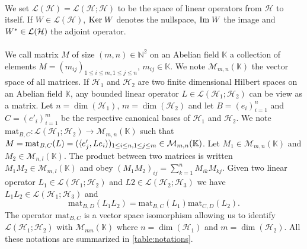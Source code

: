 \paragraph{}
We set $\mathcal{L}(\mathcal{H})=\mathcal{L}(\mathcal{H};\mathcal{H})$ to be the space of linear operators from $\mathcal{H}$ to itself. If $W\in\mathcal{L}(\mathcal{H})$, $\text{Ker}\; W$ denotes the nullspace, $\text{Im}\; W$ the image and $W^* \in \mathcal{L}(\mathcal{H})$ the adjoint operator.
\paragraph{}
We call matrix $M$ of size $(m,n)\in\mathbb{N}^2$ on an Abelian field $\mathbb{K}$ a collection of elements $M=(m_{ij})_{1\le i\le m, 1\le j \le n}$, $m_{ij}\in\mathbb{K}$. We note $\mathcal{M}_{m,n}(\mathbb{K})$ the vector space of all matrices. If $\mathcal{H}_1$ and $\mathcal{H}_2$ are two finite dimensional Hilbert spaces on an Abelian field $\mathbb{K}$, any bounded linear operator $L\in\mathcal{L}(\mathcal{H}_1;\mathcal{H}_2)$ can be view as a matrix. Let $n=\dim(\mathcal{H}_1)$, $m=\dim(\mathcal{H}_2)$ and let $B=(e_i)_{i=1}^{n}$ and $C=(e'_i)_{i=1}^{m}$ be the respective canonical bases of $\mathcal{H}_1$ and $\mathcal{H}_2$. We note $\text{mat}_{B, C}: \mathcal{L}(\mathcal{H}_1;\mathcal{H}_2) \to \mathcal{M}_{m,n}(\mathbb{K})$ such that $M=\text{mat}_{B, C}(L)=(\langle e'_j, L e_i\rangle)_{1\le i\le n, 1\le j \le m}\in\mathcal{M}_{m,n}(\mathbb{K})$. Let $M_1\in\mathcal{M}_{m,n}(\mathbb{K})$ and $M_2\in\mathcal{M}_{n,l}(\mathbb{K})$. The product between two matrices is written $M_1M_2\in\mathcal{M}_{m,l}(\mathbb{K})$ and obey $(M_1M_2)_{ij} = \sum_{k=1}^n M_{ik}M_{kj}$. Given two linear operator $L_1\in\mathcal{L}(\mathcal{H}_1;\mathcal{H}_2)$ and $L2\in\mathcal{L}(\mathcal{H}_2;\mathcal{H}_3)$ we have $L_1L_2\in\mathcal{L}(\mathcal{H}_1;\mathcal{H}_3)$ and \begin{dmath*}
\text{mat}_{B, D}(L_1L_2)=\text{mat}_{B, C}(L_1)\text{mat}_{C, D}(L_2).
\end{dmath*}
The operator $\text{mat}_{B, C}$ is a vector space isomorphism allowing us to identify $\mathcal{L}(\mathcal{H}_1;\mathcal{H}_2)$ with $\mathcal{M}_{mn}(\mathbb{K})$ where $n=\dim(\mathcal{H}_1)$ and $m=\dim(\mathcal{H}_2)$. All these notations are summarized in \cref{table:notations}.



